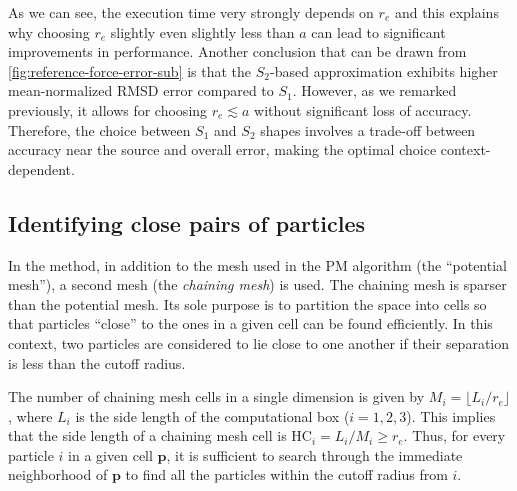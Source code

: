 As we can see, the execution time very strongly depends on $r_e$ and this explains why choosing $r_e$ slightly even slightly less than $a$ can lead to significant improvements in performance.
Another conclusion that can be drawn from \autoref{fig:reference-force-error-sub} is that the \( S_2 \)-based approximation exhibits higher mean-normalized RMSD error compared to \( S_1 \).
However, as we remarked previously, it allows for choosing $r_e \lesssim a$ without significant loss of accuracy.
Therefore, the choice between \( S_1 \) and \( S_2 \) shapes involves a trade-off between accuracy near the source and overall error, making the optimal choice context-dependent.


\subsection{Identifying close pairs of particles}
In the \PThreeM{} method, in addition to the mesh used in the PM algorithm (the ``potential mesh''), a second mesh (the \textit{chaining mesh}) is used.
The chaining mesh is sparser than the potential mesh.
Its sole purpose is to partition the space into cells so that particles ``close'' to the ones in a given cell can be found efficiently.
In this context, two particles are considered to lie close to one another if their separation is less than the cutoff radius.

The number of chaining mesh cells in a single dimension is given by $M_i = \lfloor L_i / r_e \rfloor$, where $L_i$ is the side length of the computational box ($i=1,2,3$).
This implies that the side length of a chaining mesh cell is $\text{HC}_i = L_i / M_i \geq r_e$.
Thus, for every particle $i$ in a given cell $\mathbf{p}$, it is sufficient to search through the immediate neighborhood of $\mathbf{p}$ to find all the particles within the cutoff radius from $i$.

